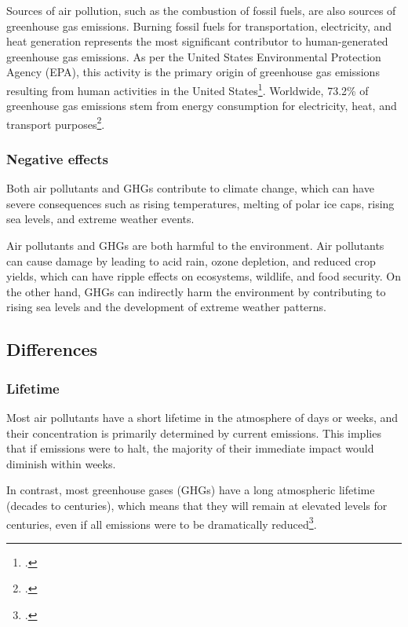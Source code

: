 \documentclass[]{article}
\begin{document}
Sources of air pollution, such as the combustion of fossil fuels, are also sources of greenhouse gas emissions.
Burning fossil fuels for transportation, electricity, and heat generation represents the most significant contributor to human-generated greenhouse gas emissions. As per the United States Environmental Protection Agency (EPA), this activity is the primary origin of greenhouse gas emissions resulting from human activities in the United States\footcite{USEPA2015}. Worldwide, 73.2\% of greenhouse gas emissions stem from energy consumption for electricity, heat, and transport purposes\footcite{OurWorld2020}.


\subsubsection{Negative effects}

Both air pollutants and GHGs contribute to climate change, which can have severe consequences such as rising temperatures, melting of polar ice caps, rising sea levels, and extreme weather events.

Air pollutants and GHGs are both harmful to the environment. Air pollutants can cause damage by leading to acid rain, ozone depletion, and reduced crop yields, which can have ripple effects on ecosystems, wildlife, and food security. On the other hand, GHGs can indirectly harm the environment by contributing to rising sea levels and the development of extreme weather patterns.

\subsection{Differences}


\subsubsection{Lifetime}

 Most air pollutants have a short lifetime in the atmosphere of days or weeks, and their concentration is primarily determined by current emissions. This implies that if emissions were to halt, the majority of their immediate impact would diminish within weeks.

 In contrast, most greenhouse gases (GHGs) have a long atmospheric lifetime (decades to centuries), which means that they will remain at elevated levels for centuries, even if all emissions were to be dramatically reduced\footcite{Warrilow2021}.
\end{document}
